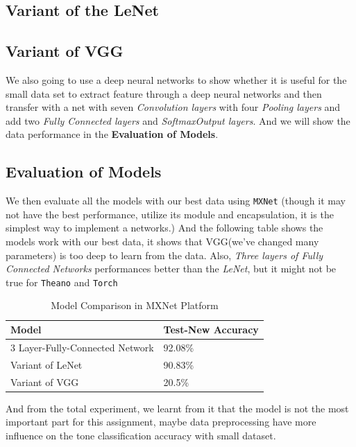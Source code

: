 \documentclass[12pt]{article}
\begin{document}
\subsection{Variant of the LeNet}

\subsection{Variant of VGG}
We also going to use a deep neural networks to show whether it is useful for the small data set to extract feature through a deep neural networks and then transfer with a net with seven {\it Convolution layers} with four {\it Pooling layers} and add two {\it Fully Connected layers} and {\it SoftmaxOutput layers}. And we will show the data performance in the {\bf Evaluation of Models}.

\subsection{Evaluation of Models}

We then evaluate all the models with our best data using \texttt{MXNet} (though it may not have the best performance, utilize its module and encapsulation, it is the simplest way to implement a networks.)
And the following table shows the models work with our best data, it shows that VGG(we've changed many parameters) is too deep to learn from the data. Also, {\it Three layers of Fully Connected Networks} performances better than the {\it LeNet}, but it might not be true for \texttt{Theano} and \texttt{Torch}

\begin{table}[!htbp]
	\caption {Model Comparison in MXNet Platform} \label{tab:title} 
	\begin{center}
		\begin{tabular}{|l|l|}
			\hline
			Model & Test-New Accuracy \\
			\hline
			3 Layer-Fully-Connected Network & 92.08\% \\
			\hline
			Variant of LeNet & 90.83\% \\
			\hline
			Variant of VGG & 20.5\% \\
			\hline
		\end{tabular}
	\end{center}
\end{table} 

And from the total experiment, we learnt from it that the model is not the most important part for this assignment, maybe data preprocessing have more influence on the tone classification accuracy with small dataset.
\end{document}
